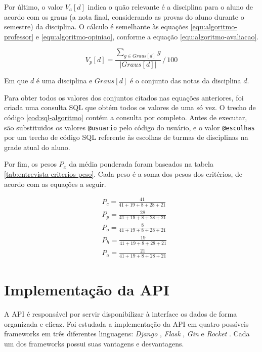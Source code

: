 Por último, o valor $V_a[d]$ indica o quão relevante é a disciplina para o aluno de acordo com os graus (a nota final, considerando as provas do aluno durante o semestre) da disciplina. O cálculo é semelhante às equações \ref{equ:algoritmo-professor} e \ref{equ:algoritmo-opiniao}, conforme a equação \ref{equ:algoritmo-avaliacao}.

\begin{equation}
    V_p[d] = \frac{\sum_{g \in Graus[d]} g} {| Graus[d] |} \,/\, 100 
    \label{equ:algoritmo-avaliacao}
\end{equation}

Em que $d$ é uma disciplina e $Graus[d]$ é o conjunto das notas da disciplina $d$.

Para obter todos os valores dos conjuntos citados nas equações anteriores, foi criada uma consulta SQL que obtém todos os valores de uma só vez. O trecho de código \ref{cod:sql-algoritmo} contém a consulta por completo. Antes de executar, são substituidos os valores \verb|@usuario| pelo código do usuário, e o valor \verb|@escolhas| por um trecho de código SQL referente às escolhas de turmas de disciplinas na grade atual do aluno.



Por fim, os pesos $P_x$ da média ponderada foram baseados na tabela \ref{tab:entrevista-criterios-peso}. Cada peso é a soma dos pesos dos critérios, de acordo com as equações a seguir.

\begin{align}
    & P_c = \frac{41}{41 + 19 + 8 + 28 + 21} \\[10pt]
    & P_p = \frac{28}{41 + 19 + 8 + 28 + 21} \\[10pt]
    & P_o = \frac{ 8}{41 + 19 + 8 + 28 + 21} \\[10pt]
    & P_h = \frac{19}{41 + 19 + 8 + 28 + 21} \\[10pt]
    & P_a = \frac{21}{41 + 19 + 8 + 28 + 21}
\end{align}

\section{Implementação da API}
\label{sec:Implementação da API}

A API é responsável por servir disponibilizar à interface os dados de forma organizada e eficaz. Foi estudada a implementação da API em quatro possíveis frameworks em três diferentes linguagens:
\textit{Django} \cite{site-django}, \textit{Flask} \cite{site-flask}, \textit{Gin} \cite{site-gin} e \textit{Rocket} \cite{site-rocket}. Cada um dos frameworks possui suas vantagens e desvantagens.

